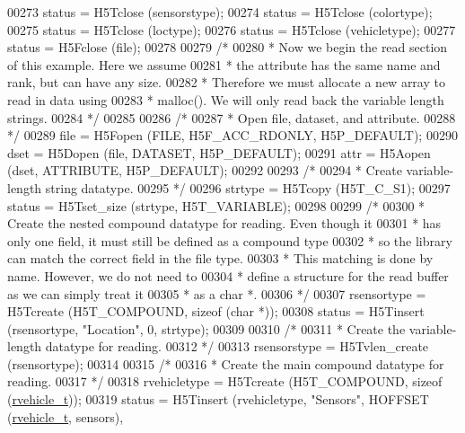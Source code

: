 \begin{DoxyCode}
00273     status = H5Tclose (sensorstype);
00274     status = H5Tclose (colortype);
00275     status = H5Tclose (loctype);
00276     status = H5Tclose (vehicletype);
00277     status = H5Fclose (file);
00278 
00279     \textcolor{comment}{/*}
00280 \textcolor{comment}{     * Now we begin the read section of this example.  Here we assume}
00281 \textcolor{comment}{     * the attribute has the same name and rank, but can have any size.}
00282 \textcolor{comment}{     * Therefore we must allocate a new array to read in data using}
00283 \textcolor{comment}{     * malloc().  We will only read back the variable length strings.}
00284 \textcolor{comment}{     */}
00285 
00286     \textcolor{comment}{/*}
00287 \textcolor{comment}{     * Open file, dataset, and attribute.}
00288 \textcolor{comment}{     */}
00289     file = H5Fopen (FILE, H5F\_ACC\_RDONLY, H5P\_DEFAULT);
00290     dset = H5Dopen (file, DATASET, H5P\_DEFAULT);
00291     attr = H5Aopen (dset, ATTRIBUTE, H5P\_DEFAULT);
00292 
00293     \textcolor{comment}{/*}
00294 \textcolor{comment}{     * Create variable-length string datatype.}
00295 \textcolor{comment}{     */}
00296     strtype = H5Tcopy (H5T\_C\_S1);
00297     status = H5Tset\_size (strtype, H5T\_VARIABLE);
00298 
00299     \textcolor{comment}{/*}
00300 \textcolor{comment}{     * Create the nested compound datatype for reading.  Even though it}
00301 \textcolor{comment}{     * has only one field, it must still be defined as a compound type}
00302 \textcolor{comment}{     * so the library can match the correct field in the file type.}
00303 \textcolor{comment}{     * This matching is done by name.  However, we do not need to}
00304 \textcolor{comment}{     * define a structure for the read buffer as we can simply treat it}
00305 \textcolor{comment}{     * as a char *.}
00306 \textcolor{comment}{     */}
00307     rsensortype = H5Tcreate (H5T\_COMPOUND, \textcolor{keyword}{sizeof} (\textcolor{keywordtype}{char} *));
00308     status = H5Tinsert (rsensortype, \textcolor{stringliteral}{"Location"}, 0, strtype);
00309 
00310     \textcolor{comment}{/*}
00311 \textcolor{comment}{     * Create the variable-length datatype for reading.}
00312 \textcolor{comment}{     */}
00313     rsensorstype = H5Tvlen\_create (rsensortype);
00314 
00315     \textcolor{comment}{/*}
00316 \textcolor{comment}{     * Create the main compound datatype for reading.}
00317 \textcolor{comment}{     */}
00318     rvehicletype = H5Tcreate (H5T\_COMPOUND, \textcolor{keyword}{sizeof} (\hyperlink{structrvehicle__t}{rvehicle\_t}));
00319     status = H5Tinsert (rvehicletype, \textcolor{stringliteral}{"Sensors"}, HOFFSET (\hyperlink{structrvehicle__t}{rvehicle\_t}, sensors),

\end{DoxyCode}
